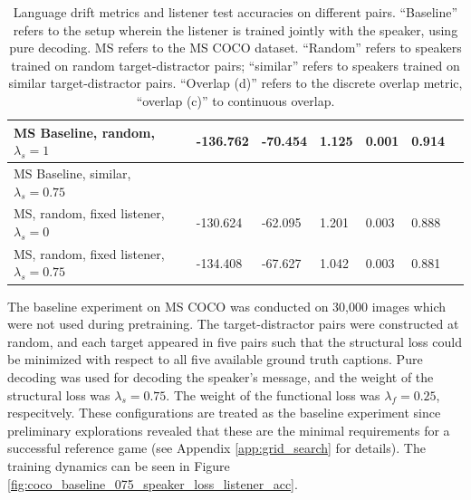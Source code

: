 \begin{table}[]
\begin{tabularx}{\textwidth}{|X|l|l|X|X|X|X|}
		MS Baseline, random, $\lambda_s =1$  &      -136.762             &          -70.454              &         1.125             &          0.001            &                   0.914                       &                                           \\ \hline
		MS Baseline, similar, $\lambda_s = 0.75$  &                   &                        &                      &                      &                                          &                                           \\ \hline
		MS, random, fixed listener, $\lambda_s = 0$  &         -130.624         &           -62.095             &     1.201                 &        0.003              &                          0.888                &                                           \\ \hline
		MS, random, fixed listener, $\lambda_s = 0.75$  &         -134.408          &           -67.627             &     1.042                 &        0.003              &                          0.881                &                                           \\ \hline
	\end{tabularx}
\caption{\label{tab:coco_drift_metrics_basic} Language drift metrics and listener test accuracies on different pairs. 
	``Baseline'' refers to the setup wherein the listener is trained jointly with the speaker, using pure decoding. MS refers to the MS COCO dataset. ``Random'' refers to speakers trained on random target-distractor pairs; ``similar'' refers to speakers trained on similar target-distractor pairs. ``Overlap (d)'' refers to the discrete overlap metric, ``overlap (c)'' to continuous overlap.}
\end{table}

The baseline experiment on MS COCO was conducted on 30,000 images which were not used during pretraining. The target-distractor pairs were constructed at random, and each target appeared in five pairs such that the structural loss could be minimized with respect to all five available ground truth captions. Pure decoding was used for decoding the speaker's message, and the weight of the structural loss was $\lambda_s = 0.75$. The weight of the functional loss was $\lambda_f = 0.25$, respecitvely. These configurations are treated as the baseline experiment since preliminary explorations revealed that these are the minimal requirements for a successful reference game (see Appendix \ref{app:grid_search} for details). The training dynamics can be seen in Figure \ref{fig:coco_baseline_075_speaker_loss_listener_acc}.

